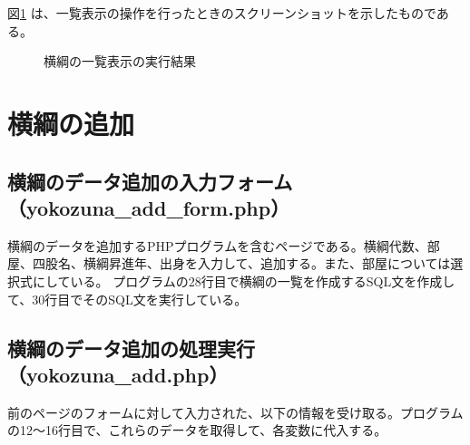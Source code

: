 \documentclass[10pt,a4paper,titlepage]{jreport}
\begin{document}
図\ref{fig:example_list1} は、一覧表示の操作を行ったときのスクリーンショットを示したものである。

\begin{figure}[h]
	\begin{center}
	\end{center}
	\caption{横綱の一覧表示の実行結果
	}
	\label{fig:example_list1}
\end{figure}


\section{横綱の追加}


\subsection{横綱のデータ追加の入力フォーム（yokozuna\_add\_form.php）}

横綱のデータを追加するPHPプログラムを含むページである。横綱代数、部屋、四股名、横綱昇進年、出身を入力して、追加する。また、部屋については選択式にしている。
プログラムの28行目で横綱の一覧を作成するSQL文を作成して、30行目でそのSQL文を実行している。\\



\subsection{横綱のデータ追加の処理実行（yokozuna\_add.php）}

前のページのフォームに対して入力された、以下の情報を受け取る。プログラムの12～16行目で、これらのデータを取得して、各変数に代入する。
\end{document}
